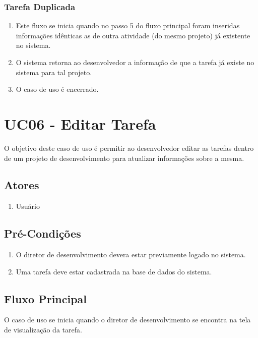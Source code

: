 \subsubsection{Tarefa Duplicada}

\begin{enumerate}
  \item Este fluxo se inicia quando no passo 5 do fluxo principal foram inseridas informações idênticas as de outra atividade (do mesmo projeto) já existente no sistema.
  \item O sistema retorna ao desenvolvedor a informação de que a tarefa já existe no sistema para tal projeto.
  \item O caso de uso é encerrado.
\end{enumerate}


\section{UC06 - Editar Tarefa}
O objetivo deste caso de uso é permitir ao desenvolvedor editar as tarefas dentro de um projeto de desenvolvimento para atualizar informações sobre a mesma.

\subsection{Atores}

\begin{enumerate}
  \item Usuário
\end{enumerate}

\subsection{Pré-Condições}
\begin{enumerate}
  \item O diretor de desenvolvimento devera estar previamente logado no sistema.
  \item Uma tarefa deve estar cadastrada na base de dados do sistema.
\end{enumerate}

\subsection{Fluxo Principal}
O caso de uso se inicia quando o diretor de desenvolvimento se encontra na tela de visualização da tarefa.

